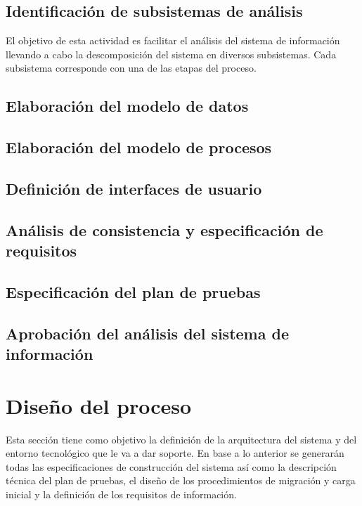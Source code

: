 \documentclass[11pt,a4paper,spanish,twoside]{report}
\begin{document}
\subsection{Identificación de subsistemas de análisis}
El objetivo de esta actividad es facilitar el análisis del sistema de
información llevando a cabo la descomposición del sistema en diversos
subsistemas. 
Cada subsistema corresponde con una de las etapas del proceso.
\subsection{Elaboración del modelo de datos}

\subsection{Elaboración del modelo de procesos}
\subsection{Definición de interfaces de usuario}
\subsection{Análisis de consistencia y especificación de requisitos}
\subsection{Especificación del plan de pruebas}
\subsection{Aprobación del análisis del sistema de información}
\section{Diseño del proceso}
Esta sección tiene como objetivo la definición de la arquitectura del sistema y
del entorno tecnológico que le va a dar soporte. En base a lo anterior se
generarán todas las especificaciones de construcción del sistema así como la
descripción técnica del plan de pruebas, el diseño de los procedimientos de
migración y carga inicial y la definición de los requisitos de información.
\end{document}
